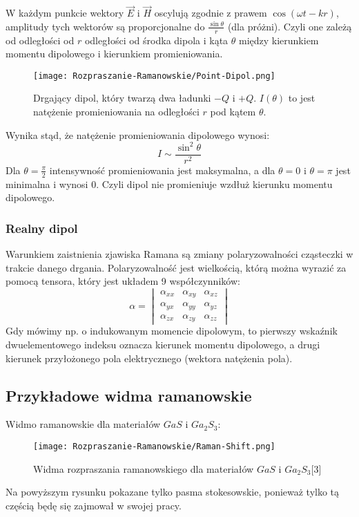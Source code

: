 W każdym punkcie wektory $\overrightarrow{E}$ i $\overrightarrow{H}$ oscylują zgodnie z prawem $\cos(\omega t - kr)$, amplitudy tych wektorów są proporcjonalne do
$\frac{\sin \theta}{r}$ (dla próżni). Czyli one zależą od odległości od $r$ odległości od środka dipola i kąta $\theta$ między kierunkiem momentu dipolowego i kierunkiem promieniowania.
\begin{figure}[H]
	\begin{center}
		\texttt{[image: Rozpraszanie-Ramanowskie/Point-Dipol.png]}
		\caption{Drgający dipol, który twarzą dwa ładunki $-Q$ i $+Q$. $I(\theta)$ to jest natężenie promieniowania na odległości $r$ pod kątem $\theta$.}
	\end{center}
\end{figure}
Wynika stąd, że natężenie promieniowania dipolowego wynosi:
\begin{equation}
	I \sim \frac{\sin^{2}\theta}{r^{2}}
\end{equation}
Dla $\theta = \frac{\pi}{2}$ intensywność promieniowania jest maksymalna, a dla 
$\theta = 0$ i $\theta = \pi$ jest minimalna i wynosi $0$. Czyli dipol nie promieniuje wzdłuż kierunku momentu dipolowego.
\subsubsection{Realny dipol}
Warunkiem zaistnienia zjawiska Ramana są zmiany polaryzowalności cząsteczki w trakcie danego drgania. Polaryzowalność jest wielkością, którą można wyrazić za pomocą tensora, który jest układem 9 współczynników:
\begin{equation}
	\alpha = 
	\begin{vmatrix}
	\alpha_{xx} & \alpha_{xy} & \alpha_{xz} \\
	\alpha_{yx} & \alpha_{yy} & \alpha_{yz} \\
	\alpha_{zx} & \alpha_{zy} & \alpha_{zz}
	\end{vmatrix}
\end{equation}
Gdy mówimy np. o indukowanym momencie dipolowym, to pierwszy wskaźnik dwuelementowego indeksu oznacza kierunek momentu dipolowego, a drugi kierunek przyłożonego pola elektrycznego (wektora natężenia pola).

\newpage
\subsection{Przykładowe widma ramanowskie}
Widmo ramanowskie dla materiałów $GaS$ i $Ga_{2}S_{3}$:
\begin{figure}[H]
	\begin{center}
		\texttt{[image: Rozpraszanie-Ramanowskie/Raman-Shift.png]}
		\caption{Widma rozpraszania ramanowskiego dla materiałów $GaS$ i $Ga_{2}S_{3}$[3]}
	\end{center}
\end{figure}
Na powyższym rysunku pokazane tylko pasma stokesowskie, ponieważ tylko tą częścią będę się zajmował w swojej pracy.

